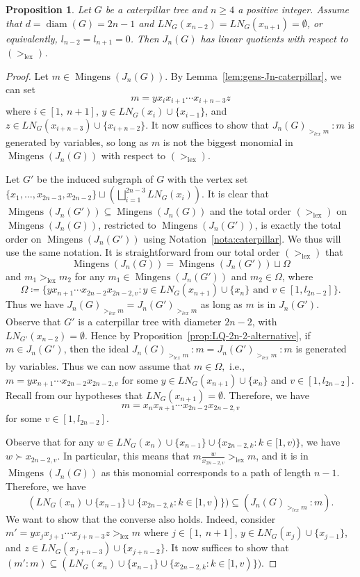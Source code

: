 \documentclass{amsart}
\newtheorem{proposition}[theorem]{Proposition}
\theoremstyle{remark}
\theoremstyle{definition}
\DeclareMathOperator{\mingens}{Mingens}
\DeclareMathOperator{\lex}{lex}
\DeclareMathOperator{\diam}{diam}
\begin{document}
	\begin{proposition}\label{prop:LQ-2n-1}
		Let $G$ be a caterpillar tree and $n\geq 4$ a positive integer. Assume that $d=\diam(G)=2n-1$ and $LN_G(x_{n-2})=LN_G(x_{n+1})=\emptyset$, or equivalently, $l_{n-2}=l_{n+1}=0$. Then $J_n(G)$ has linear quotients with respect to $(>_{\lex})$.
	\end{proposition}
	\begin{proof}
		Let $m\in \mingens(J_n(G))$. By Lemma~\ref{lem:gens-Jn-caterpillar}, we can set \[m=yx_ix_{i+1}\cdots x_{i+n-3}z\]
		where $i\in [1,\ n+1]$, $y\in LN_G(x_i)\cup \{x_{i-1}\}$, and $z\in  LN_G(x_{i+n-3})\cup \{x_{i+n-2}\}$. It now suffices to show that $J_n(G)_{>_{lex}m} \ \colon m$ is generated by variables, so long as $m$ is not the biggest monomial in $\mingens(J_n(G))$ with respect to $(>_{\lex})$.
		
		Let $G'$ be the induced subgraph of $G$ with the vertex set $\{x_1,\dots, x_{2n-3},x_{2n-2}\}\sqcup \left( \bigsqcup_{i=1}^{2n-3} LN_G(x_i) \right)$. It is clear that $\mingens(J_n(G'))\subseteq \mingens(J_n(G))$ and the total order $(>_{\lex})$ on $\mingens(J_n(G))$, restricted to $\mingens(J_n(G'))$, is exactly the total order on $\mingens(J_n(G'))$ using Notation~\ref{nota:caterpillar}. We thus will use the same notation. It is straightforward from our total order $(>_{\lex})$ that
		\[
		\mingens(J_n(G))= \mingens(J_n(G')) \sqcup \Omega
		\]
		and $m_1>_{\lex} m_2$ for any $m_1\in \mingens(J_n(G'))$ and $m_2\in \Omega$, where
		\[
		\Omega\coloneqq \{yx_{n+1}\cdots x_{2n-2}x_{2n-2,v}\colon y\in LN_G(x_{n+1})\cup \{x_{n}\} \text{ and } v\in [1,l_{2n-2}] \}.\]
		Thus we have $J_n(G)_{>_{lex}m} =J_n(G')_{>_{lex}m} $ as long as $m$ is in $J_n(G')$. Observe that $G'$ is a caterpillar tree with diameter $2n-2$, with $LN_{G'}(x_{n-2})=\emptyset$. Hence by Proposition~\ref{prop:LQ-2n-2-alternative}, if $m\in J_n(G')$, then the ideal $J_n(G)_{>_{lex}m} \ \colon m = J_n(G')_{>_{lex}m} \ \colon m$ is generated by variables. Thus we can now assume that $m\in \Omega,$ i.e., $m= yx_{n+1}\cdots x_{2n-2}x_{2n-2,v}$
		for some $y\in LN_G(x_{n+1})\cup \{x_{n}\}$ and $v\in [1,l_{2n-2}]$. Recall from our hypotheses that $LN_G(x_{n+1})=\emptyset$. Therefore, we have     
		\[
		m= x_{n}x_{n+1}\cdots x_{2n-2}x_{2n-2,v}
		\]
		for some $v\in [1,l_{2n-2}]$. 
		
		Observe that for any $w\in LN_G(x_{n}) \cup \{x_{n-1}\} \cup \{x_{2n-2,k}\colon k\in [1,v)\}$, we have $w\succ x_{2n-2,v}$. In particular, this means that  $m\frac{w}{x_{2n-2,v}} >_{\lex}  m$, and it is in $\mingens(J_n(G))$ as this monomial corresponds to a path of length $n-1$. Therefore, we have 
		\[
		(LN_G(x_{n}) \cup \{x_{n-1}\} \cup \{x_{2n-2,k}\colon k\in [1,v)\}) \subseteq (J_n(G)_{>_{lex}m} \ \colon m).
		\]
		We want to show that the converse also holds. Indeed, consider $m'=yx_jx_{j+1}\cdots x_{j+n-3}z>_{\lex}  m$ where $j\in [1,\ n+1]$, $y\in LN_G(x_j)\cup \{x_{j-1}\}$, and $z\in  LN_G(x_{j+n-3})\cup \{x_{j+n-2}\}$. It now suffices to show that $(m':m)\subseteq (LN_G(x_{n}) \cup \{x_{n-1}\} \cup \{x_{2n-2,k}\colon k\in [1,v)\})$.
		

\end{proof}
\end{document}
